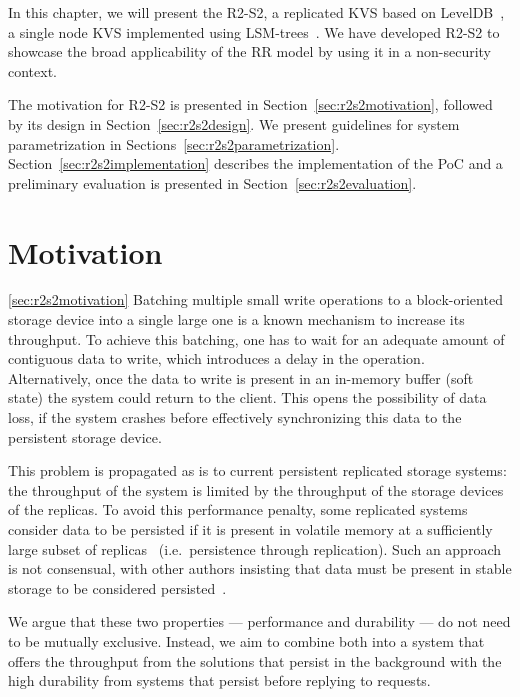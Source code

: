 \label{chap:storage}
\cleardoublepage{}

In this chapter, we will present the \acf{R2-S2}, a replicated
\ac{KVS} based on LevelDB~\cite{leveldb}, a single node \ac{KVS}
implemented using  \acp{LSM-tree}~\cite{lsm}. We have developed
\ac{R2-S2} to showcase the broad applicability of the \ac{RR}
model by using it in a non-security context.

The motivation for \ac{R2-S2} is presented in
Section~\ref{sec:r2s2motivation}, followed by its design in
Section~\ref{sec:r2s2design}. We present guidelines for system
parametrization in Sections~\ref{sec:r2s2parametrization}.
Section~\ref{sec:r2s2implementation} describes the implementation
of the PoC and a preliminary evaluation is presented in
Section~\ref{sec:r2s2evaluation}.

\section{Motivation}\ref{sec:r2s2motivation}
Batching multiple small write operations to a block-oriented storage device into a
single large one is a known mechanism to increase its throughput.
To achieve this batching, one has to wait for an adequate amount
of contiguous data to write, which introduces a delay in the
operation. Alternatively, once the data to write is present in
an in-memory buffer (soft state) the system could return to the
client. This opens the possibility of data loss, if the system
crashes before effectively synchronizing this data to the persistent
storage device.

%
This problem is propagated as is to current persistent replicated storage
systems: the throughput of the system is limited by the
throughput of the storage devices of the replicas. To avoid this
performance penalty, some replicated systems consider data to be persisted if it is
present in volatile memory at a sufficiently large subset of replicas~\cite{pbft}
(i.e.\ persistence through replication). Such an approach is not
consensual, with other authors insisting that data must be
present in stable storage to be considered
persisted~\cite{bolosky:paxos}.

We argue that these two properties --- performance and
durability --- do not need to be mutually exclusive. Instead, we
aim to combine both into a system that offers the throughput from
the solutions that persist in the background with the high
durability from systems that persist before replying to
requests.

